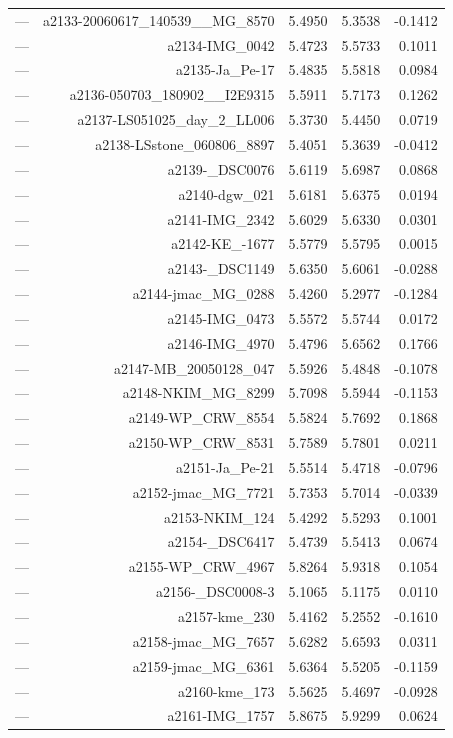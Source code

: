 \begin{table}[htbp]
\begin{tabular}{lrrrr}
— & a2133-20060617_140539__MG_8570 & 5.4950 & 5.3538 & -0.1412 \\
— & a2134-IMG_0042 & 5.4723 & 5.5733 & 0.1011 \\
— & a2135-Ja_Pe-17 & 5.4835 & 5.5818 & 0.0984 \\
— & a2136-050703_180902__I2E9315 & 5.5911 & 5.7173 & 0.1262 \\
— & a2137-LS051025_day_2_LL006 & 5.3730 & 5.4450 & 0.0719 \\
— & a2138-LSstone_060806_8897 & 5.4051 & 5.3639 & -0.0412 \\
— & a2139-_DSC0076 & 5.6119 & 5.6987 & 0.0868 \\
— & a2140-dgw_021 & 5.6181 & 5.6375 & 0.0194 \\
— & a2141-IMG_2342 & 5.6029 & 5.6330 & 0.0301 \\
— & a2142-KE_-1677 & 5.5779 & 5.5795 & 0.0015 \\
— & a2143-_DSC1149 & 5.6350 & 5.6061 & -0.0288 \\
— & a2144-jmac_MG_0288 & 5.4260 & 5.2977 & -0.1284 \\
— & a2145-IMG_0473 & 5.5572 & 5.5744 & 0.0172 \\
— & a2146-IMG_4970 & 5.4796 & 5.6562 & 0.1766 \\
— & a2147-MB_20050128_047 & 5.5926 & 5.4848 & -0.1078 \\
— & a2148-NKIM_MG_8299 & 5.7098 & 5.5944 & -0.1153 \\
— & a2149-WP_CRW_8554 & 5.5824 & 5.7692 & 0.1868 \\
— & a2150-WP_CRW_8531 & 5.7589 & 5.7801 & 0.0211 \\
— & a2151-Ja_Pe-21 & 5.5514 & 5.4718 & -0.0796 \\
— & a2152-jmac_MG_7721 & 5.7353 & 5.7014 & -0.0339 \\
— & a2153-NKIM_124 & 5.4292 & 5.5293 & 0.1001 \\
— & a2154-_DSC6417 & 5.4739 & 5.5413 & 0.0674 \\
— & a2155-WP_CRW_4967 & 5.8264 & 5.9318 & 0.1054 \\
— & a2156-_DSC0008-3 & 5.1065 & 5.1175 & 0.0110 \\
— & a2157-kme_230 & 5.4162 & 5.2552 & -0.1610 \\
— & a2158-jmac_MG_7657 & 5.6282 & 5.6593 & 0.0311 \\
— & a2159-jmac_MG_6361 & 5.6364 & 5.5205 & -0.1159 \\
— & a2160-kme_173 & 5.5625 & 5.4697 & -0.0928 \\
— & a2161-IMG_1757 & 5.8675 & 5.9299 & 0.0624 \\

\end{tabular}
\end{table}
